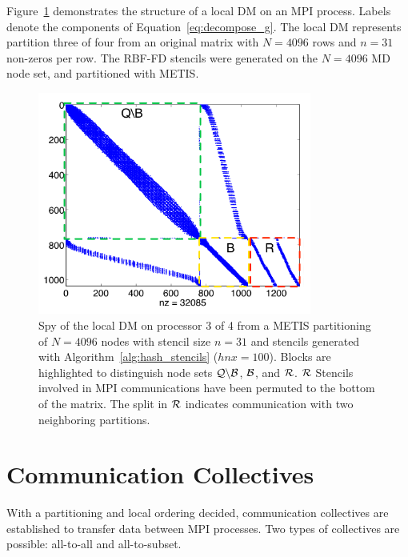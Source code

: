 \documentclass{report}
\begin{document}
Figure~\ref{fig:decomp_spy} demonstrates the structure of a local DM on an MPI process. Labels denote the components of Equation~\ref{eq:decompose_g}. The local DM represents partition three of four from an original matrix with $N=4096$ rows and $n=31$ non-zeros per row. The RBF-FD stencils were generated on the $N=4096$ MD node set, and partitioned with METIS. 
\begin{figure}
\begin{center}
\includegraphics[width=9cm]{rbffd_methods_content/decompositions/spy_metis_stencil_example_labels.png}
\caption{Spy of the local DM on processor 3 of 4 from a METIS partitioning of $N=4096$ nodes with stencil size $n=31$ and stencils generated with Algorithm~\ref{alg:hash_stencils} ($hnx=100$). Blocks are highlighted to distinguish node sets $\mathcal{Q} \backslash \mathcal{B}$, $\mathcal{B}$, and $\mathcal{R}$. $\mathcal{R}$ Stencils involved in MPI communications have been permuted to the bottom of the matrix. The split in $\mathcal{R}$ indicates communication with two neighboring partitions. }
\label{fig:decomp_spy}
\end{center}
\end{figure}




\section{Communication Collectives}
\label{sec:mpi_collectives}

With a partitioning and local ordering decided, communication collectives are established to transfer data between MPI processes. Two types of collectives are possible: all-to-all and all-to-subset. 
\end{document}
